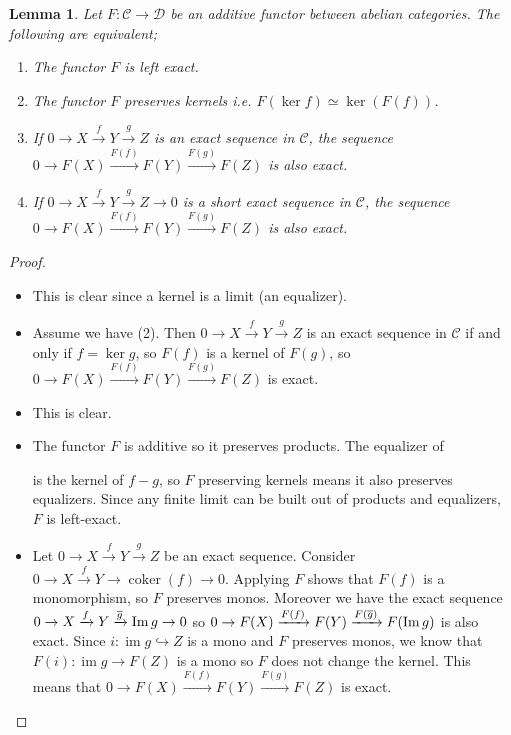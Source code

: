 \documentclass{article}
\newcommand{\cat}{\mathcal{C}}
\newcommand{\catt}{\mathcal{D}}
\DeclareMathOperator{\coker}{coker}
\DeclareMathOperator{\im}{im}
\renewcommand{\Im}{\mathop{\rm Im}}
\theoremstyle{plain}
\newtheorem{lemma}[theorem]{Lemma}
\theoremstyle{definition}
\theoremstyle{remark}
\begin{document}
\begin{lemma}
    Let $F : \cat \to \catt$ be an additive functor between abelian categories. The following are equivalent;
    \begin{enumerate}
        \item[(1)] The functor $F$ is left exact.
        \item[(2)] The functor $F$ preserves kernels i.e. $F(\ker f) \simeq \ker(F(f))$.
        \item[(3)] If $0 \to X \xrightarrow{f} Y \xrightarrow{g} Z$ is an exact sequence in $\cat$, the sequence $0 \to F(X) \xrightarrow{F(f)} F(Y) \xrightarrow{F(g)} F(Z)$ is also exact.
        \item[(4)] If $0 \to X \xrightarrow{f} Y \xrightarrow{g} Z \to 0 $ is a short exact sequence in $\cat$, the sequence $0 \to F(X) \xrightarrow{F(f)} F(Y) \xrightarrow{F(g)} F(Z)$ is also exact.
    \end{enumerate}
\end{lemma}

\begin{proof} \leavevmode
    \begin{itemize}
        \item[$(1) \Rightarrow (2)$] This is clear since a kernel is a limit (an equalizer).
        \item[$(2) \Rightarrow (3)$] Assume we have (2). Then $0 \to X \xrightarrow{f} Y \xrightarrow{g} Z$ is an exact sequence in $\cat$ if and only if $f = \ker g$, so $F(f)$ is a kernel of $F(g)$, so $0 \to F(X) \xrightarrow{F(f)} F(Y) \xrightarrow{F(g)} F(Z)$ is exact.
        \item[$(3) \Rightarrow (4)$] This is clear.
        \item[$(2) \Rightarrow (1)$] The functor $F$ is additive so it preserves products. The equalizer of  is the kernel of $f-g$, so $F$ preserving kernels means it also preserves equalizers. Since any finite limit can be built out of products and equalizers, $F$ is left-exact.
        \item[$(4) \Rightarrow (3)$] Let $0 \to X \xrightarrow{f} Y \xrightarrow{g} Z$ be an exact sequence. Consider $0 \to X \xrightarrow{f} Y \to \coker(f) \to 0$. Applying $F$ shows that $F(f)$ is a monomorphism, so $F$ preserves monos. Moreover we have the exact sequence $0 \to X \xrightarrow{f} Y \xrightarrow{\overline{g}} \Im g \to 0$ so $0 \to F(X) \xrightarrow{F(f)} F(Y) \xrightarrow{F(\overline{g})} F(\Im g)$ is also exact. Since $i : \im g \hookrightarrow Z$ is a mono and $F$ preserves monos, we know that $F(i) : \im g \to F(Z)$ is a mono so $F$ does not change the kernel. This means that $0 \to F(X) \xrightarrow{F(f)} F(Y) \xrightarrow{F(g)} F(Z)$ is exact.
    \end{itemize}
\end{proof}
\end{document}
